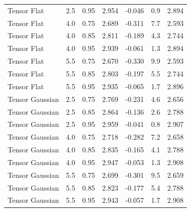 \begin{table}[htbp]
\begin{tabular}{@{}llrrrrr@{}}
Tensor Flat & 2.5 & 0.95 & 2.954 & -0.046 & 0.9 & 2.894 \\
Tensor Flat & 4.0 & 0.75 & 2.689 & -0.311 & 7.7 & 2.593 \\
Tensor Flat & 4.0 & 0.85 & 2.811 & -0.189 & 4.3 & 2.744 \\
Tensor Flat & 4.0 & 0.95 & 2.939 & -0.061 & 1.3 & 2.894 \\
Tensor Flat & 5.5 & 0.75 & 2.670 & -0.330 & 9.9 & 2.593 \\
Tensor Flat & 5.5 & 0.85 & 2.803 & -0.197 & 5.5 & 2.744 \\
Tensor Flat & 5.5 & 0.95 & 2.935 & -0.065 & 1.7 & 2.896 \\
Tensor Gaussian & 2.5 & 0.75 & 2.769 & -0.231 & 4.6 & 2.656 \\
Tensor Gaussian & 2.5 & 0.85 & 2.864 & -0.136 & 2.6 & 2.788 \\
Tensor Gaussian & 2.5 & 0.95 & 2.959 & -0.041 & 0.8 & 2.907 \\
Tensor Gaussian & 4.0 & 0.75 & 2.718 & -0.282 & 7.2 & 2.658 \\
Tensor Gaussian & 4.0 & 0.85 & 2.835 & -0.165 & 4.1 & 2.788 \\
Tensor Gaussian & 4.0 & 0.95 & 2.947 & -0.053 & 1.3 & 2.908 \\
Tensor Gaussian & 5.5 & 0.75 & 2.699 & -0.301 & 9.5 & 2.659 \\
Tensor Gaussian & 5.5 & 0.85 & 2.823 & -0.177 & 5.4 & 2.788 \\
Tensor Gaussian & 5.5 & 0.95 & 2.943 & -0.057 & 1.7 & 2.908 \\
\bottomrule
\end{tabular}
\end{table}
